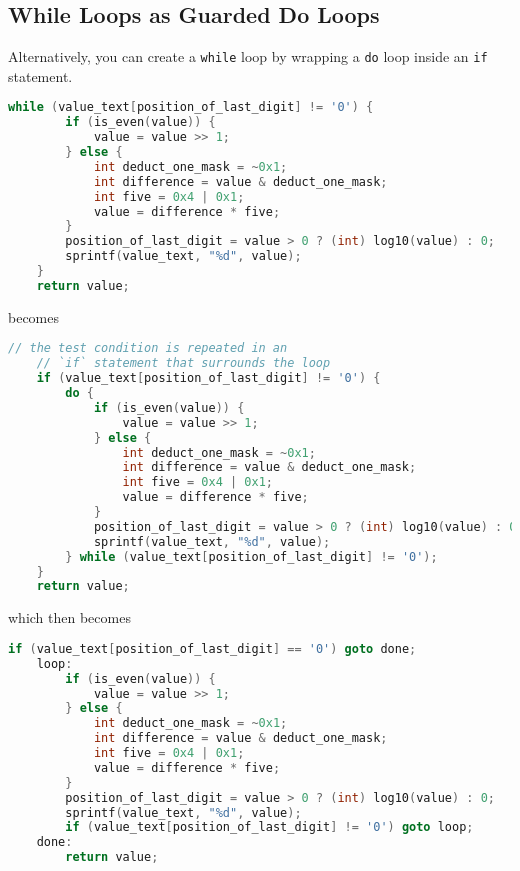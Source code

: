 \documentclass{article}
\begin{document}
\newpage
\subsection{While Loops as Guarded Do Loops}

Alternatively, you can create a \lstinline{while} loop by wrapping a \lstinline{do} loop inside an \lstinline{if} statement.

\begin{lstlisting}[language=C]
    while (value_text[position_of_last_digit] != '0') {
        if (is_even(value)) {
            value = value >> 1;
        } else {
            int deduct_one_mask = ~0x1;
            int difference = value & deduct_one_mask;
            int five = 0x4 | 0x1;
            value = difference * five;
        }
        position_of_last_digit = value > 0 ? (int) log10(value) : 0;
        sprintf(value_text, "%d", value);
    }
    return value;
\end{lstlisting}

becomes

\begin{lstlisting}[language=C]
    // the test condition is repeated in an
    // `if` statement that surrounds the loop
    if (value_text[position_of_last_digit] != '0') {
        do {
            if (is_even(value)) {
                value = value >> 1;
            } else {
                int deduct_one_mask = ~0x1;
                int difference = value & deduct_one_mask;
                int five = 0x4 | 0x1;
                value = difference * five;
            }
            position_of_last_digit = value > 0 ? (int) log10(value) : 0;
            sprintf(value_text, "%d", value);
        } while (value_text[position_of_last_digit] != '0');
    }
    return value;
\end{lstlisting}
\newpage
which then becomes

\begin{lstlisting}[language=C]
        if (value_text[position_of_last_digit] == '0') goto done;
    loop:
        if (is_even(value)) {
            value = value >> 1;
        } else {
            int deduct_one_mask = ~0x1;
            int difference = value & deduct_one_mask;
            int five = 0x4 | 0x1;
            value = difference * five;
        }
        position_of_last_digit = value > 0 ? (int) log10(value) : 0;
        sprintf(value_text, "%d", value);
        if (value_text[position_of_last_digit] != '0') goto loop;
    done:
        return value;
\end{lstlisting}
\end{document}

